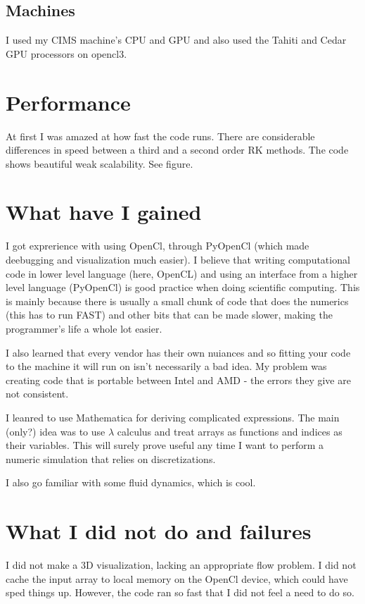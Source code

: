 \documentclass[paper=a4, fontsize=11pt]{scrartcl} %
\numberwithin{equation}{section} %
\numberwithin{figure}{section} %
\numberwithin{table}{section} %
\begin{document}
\subsection{Machines}
I used my CIMS machine's CPU and GPU and also used the Tahiti and Cedar GPU processors on opencl3.



\section{Performance}
At first I was amazed at how fast the code runs. There are considerable differences in speed between a third and a second order RK methods.
The code shows beautiful weak scalability. See figure.

\section{What have I gained}
I got exprerience with using OpenCl, through PyOpenCl (which made deebugging and visualization much easier). I believe that writing 
computational code in lower level language (here, OpenCL) and using an interface from a higher level language (PyOpenCl) is good
practice when doing scientific computing. This is mainly because there is usually a small chunk of code that does the numerics (this has to 
run FAST) and other bits that can be made slower, making the programmer's life a whole lot easier.

I also learned that every vendor has their own nuiances and so fitting your code to the machine it will run on isn't necessarily
a bad idea. My problem was creating code that is portable between Intel and AMD - the errors they give are not consistent.

I leanred to use Mathematica for deriving complicated expressions. The main (only?) idea was to use $\lambda$ calculus
and treat arrays as functions and indices as their variables. This will surely prove useful any time I want to perform a numeric
simulation that relies on discretizations.

I also go familiar with some fluid dynamics, which is cool.

\section{What I did not do and failures}
I did not make a 3D visualization, lacking an appropriate flow problem. I did not cache the input array to local memory on the OpenCl device, which 
could have sped things up. However, the code ran so fast that I did not feel a need to do so.
\end{document}
